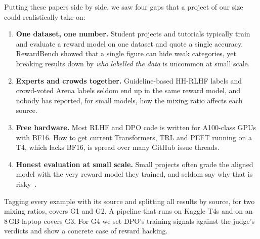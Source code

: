 Putting these papers side by side, we saw four gaps that a project of our size could realistically take on:
\begin{enumerate}[label=\textbf{G\arabic*.}]
  \item \textbf{One dataset, one number.} Student projects and tutorials typically train and evaluate a reward model on one dataset and quote a single accuracy. RewardBench showed that a single figure can hide weak categories, yet breaking results down by \emph{who labelled the data} is uncommon at small scale.
  \item \textbf{Experts and crowds together.} Guideline-based HH-RLHF labels and crowd-voted Arena labels seldom end up in the same reward model, and nobody has reported, for small models, how the mixing ratio affects each source.
  \item \textbf{Free hardware.} Most RLHF and DPO code is written for A100-class GPUs with BF16. How to get current Transformers, TRL and PEFT running on a T4, which lacks BF16, is spread over many GitHub issue threads.
  \item \textbf{Honest evaluation at small scale.} Small projects often grade the aligned model with the very reward model they trained, and seldom say why that is risky~\cite{gao2023overoptimization,casper2023open}.
\end{enumerate}
Tagging every example with its source and splitting all results by source, for two mixing ratios, covers G1 and G2. A pipeline that runs on Kaggle T4s and on an 8\,GB laptop covers G3. For G4 we set DPO's training signals against the judge's verdicts and show a concrete case of reward hacking.
